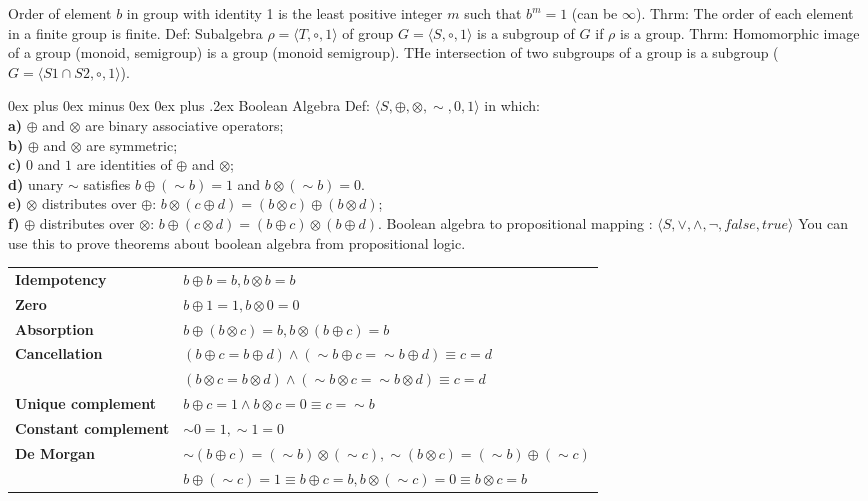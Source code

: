 \documentclass[letterpaper, 8pt]{extarticle}
\makeatletter
\renewcommand{\subsection}{\@startsection{subsection}{2}{0mm}%
                                {0ex plus 0ex minus 0ex}%
                                {0ex plus .2ex}%
                                {\normalfont\small\bfseries}}
\makeatother
\begin{document}
\begin{multicols*}{3}
    Order of element $b$ in group with identity 1 is the least positive integer $m$
    such that $b^m = 1$ (can be $\infty$).
    Thrm: The order of each element in a finite group is finite.
    Def: Subalgebra $\rho = \langle T, \circ, 1 \rangle$ of
    group $G = \langle S, \circ, 1 \rangle$ is a subgroup of $G$ if $\rho$ is a group.
    Thrm: Homomorphic image of a group (monoid, semigroup) is a group (monoid semigroup).
    THe intersection of two subgroups of a group is a subgroup ($G = \langle S1 \cap S2, \circ, 1 \rangle$).

    \subsection{Boolean Algebra}
    Def: $\langle S, \oplus, \otimes, \sim, 0, 1 \rangle$ in which: \\
    \textbf{a)} $\oplus$ and $\otimes$ are binary associative operators; \\
    \textbf{b)} $\oplus$ and $\otimes$ are symmetric; \\
    \textbf{c)} $0$ and $1$ are identities of $\oplus$ and $\otimes$; \\
    \textbf{d)} unary $\sim$ satisfies $b \oplus (\sim b) = 1$ and $b \otimes (\sim b) = 0$. \\
    \textbf{e)} $\otimes$ distributes over $\oplus$: $b \otimes (c \oplus d) = (b \otimes c) \oplus (b \otimes d)$; \\
    \textbf{f)} $\oplus$ distributes over $\otimes$: $b \oplus (c \otimes d) = (b \oplus c) \otimes (b \oplus d)$.
    Boolean algebra to propositional mapping : $\langle S,\lor,\land, \neg, false,true \rangle$ You can use this to prove theorems about boolean algebra from propositional logic.

    \begin{tabulary}{\linewidth}{@{}LL@{}}
        \textbf{Idempotency} & $b \oplus b = b, b \otimes b = b$ \\
        \textbf{Zero} & $b \oplus 1 = 1, b \otimes 0 = 0$ \\
        \textbf{Absorption} & $b \oplus (b \otimes c) = b, b \otimes (b \oplus c) = b$ \\
        \textbf{Cancellation} & $(b \oplus c = b \oplus d) \land (\sim b \oplus c = \sim b \oplus d) \equiv c = d$ \\
        & $(b \otimes c = b \otimes d) \land (\sim b \otimes c = \sim b \otimes d) \equiv c = d$ \\
        \textbf{Unique complement} & $b \oplus c = 1 \land b \otimes c = 0 \equiv c = \sim b$ \\
        \textbf{Constant complement} & $\sim 0 = 1, \sim 1 = 0$ \\
        \textbf{De Morgan} & $\sim (b \oplus c) = (\sim b) \otimes (\sim c), \sim (b \otimes c) = (\sim b) \oplus (\sim c)$ \\
        & $b \oplus (\sim c) = 1 \equiv b \oplus c = b, b \otimes (\sim c) = 0 \equiv b \otimes c = b$ \\
    \end{tabulary}


\end{multicols*}
\end{document}
